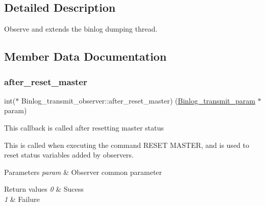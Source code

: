 \subsection{Detailed Description}
Observe and extends the binlog dumping thread. 

\subsection{Member Data Documentation}
\mbox{\label{structBinlog__transmit__observer_a1accd815cbf533bc1cfb2d3985975a6b}} 
\subsubsection{\texorpdfstring{after\+\_\+reset\+\_\+master}{after\_reset\_master}}
{\footnotesize\ttfamily int($\ast$ Binlog\+\_\+transmit\+\_\+observer\+::after\+\_\+reset\+\_\+master) (\mbox{\hyperlink{structBinlog__transmit__param}{Binlog\+\_\+transmit\+\_\+param}} $\ast$param)}

This callback is called after resetting master status

This is called when executing the command R\+E\+S\+ET M\+A\+S\+T\+ER, and is used to reset status variables added by observers.


\begin{DoxyParams}{Parameters}
{\em param} & Observer common parameter\\
\hline
\end{DoxyParams}

\begin{DoxyRetVals}{Return values}
{\em 0} & Sucess \\
\hline
{\em 1} & Failure \\
\hline
\end{DoxyRetVals}
\mbox{\label{structBinlog__transmit__observer_abd4c85bf449108fec519176238621733}} 
